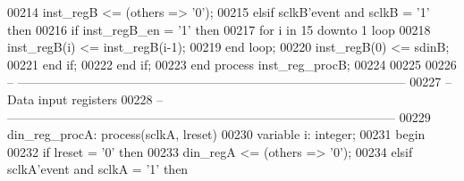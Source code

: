 \begin{DoxyCode}
00214       inst\_regB <= (\textcolor{keywordflow}{others} => '0');
00215    \textcolor{keywordflow}{elsif} \textcolor{vhdlchar}{sclkB}\textcolor{vhdlchar}{'}\textcolor{vhdlkeyword}{event} \textcolor{keywordflow}{and} \textcolor{vhdlchar}{sclkB} \textcolor{vhdlchar}{=} \textcolor{vhdlchar}{'}\textcolor{vhdllogic}{}\textcolor{vhdllogic}{1}\textcolor{vhdlchar}{'} \textcolor{keywordflow}{then}
00216       \textcolor{keywordflow}{if} \textcolor{vhdlchar}{inst_regB_en} \textcolor{vhdlchar}{=} \textcolor{vhdlchar}{'}\textcolor{vhdllogic}{}\textcolor{vhdllogic}{1}\textcolor{vhdlchar}{'} \textcolor{keywordflow}{then}
00217          \textcolor{keywordflow}{for} \textcolor{vhdlchar}{i} \textcolor{keywordflow}{in} \textcolor{vhdllogic}{}\textcolor{vhdllogic}{15} \textcolor{keywordflow}{downto} \textcolor{vhdllogic}{}\textcolor{vhdllogic}{1} \textcolor{keywordflow}{loop}
00218             inst\_regB(i) <= inst\_regB(i-1);
00219          \textcolor{keywordflow}{end} \textcolor{keywordflow}{loop};
00220          inst\_regB(\textcolor{vhdllogic}{0}) <= sdinB;
00221       \textcolor{keywordflow}{end} \textcolor{keywordflow}{if};
00222    \textcolor{keywordflow}{end} \textcolor{keywordflow}{if};
00223 \textcolor{keywordflow}{end} \textcolor{keywordflow}{process} \textcolor{vhdlchar}{inst\_reg\_procB};
00224 
00225 
00226 \textcolor{keyword}{-- ---------------------------------------------------------------------------------------------}
00227 \textcolor{keyword}{-- Data input registers}
00228 \textcolor{keyword}{-- ---------------------------------------------------------------------------------------------}
00229 din\_reg\_procA: \textcolor{keywordflow}{process}(sclkA, lreset)
00230    \textcolor{keywordflow}{variable} \textcolor{vhdlchar}{i}\textcolor{vhdlchar}{:} \textcolor{comment}{integer};
00231 \textcolor{vhdlkeyword}{begin}
00232    \textcolor{keywordflow}{if} \textcolor{vhdlchar}{lreset} \textcolor{vhdlchar}{=} \textcolor{vhdlchar}{'}\textcolor{vhdllogic}{}\textcolor{vhdllogic}{0}\textcolor{vhdlchar}{'} \textcolor{keywordflow}{then}
00233       \textcolor{vhdlchar}{din_regA} \textcolor{vhdlchar}{<=} \textcolor{vhdlchar}{(}\textcolor{keywordflow}{others} \textcolor{vhdlchar}{=}\textcolor{vhdlchar}{>} \textcolor{vhdlchar}{'}\textcolor{vhdllogic}{}\textcolor{vhdllogic}{0}\textcolor{vhdlchar}{'}\textcolor{vhdlchar}{)};
00234    \textcolor{keywordflow}{elsif} \textcolor{vhdlchar}{sclkA}\textcolor{vhdlchar}{'}\textcolor{vhdlkeyword}{event} \textcolor{keywordflow}{and} \textcolor{vhdlchar}{sclkA} \textcolor{vhdlchar}{=} \textcolor{vhdlchar}{'}\textcolor{vhdllogic}{}\textcolor{vhdllogic}{1}\textcolor{vhdlchar}{'} \textcolor{keywordflow}{then}

\end{DoxyCode}
